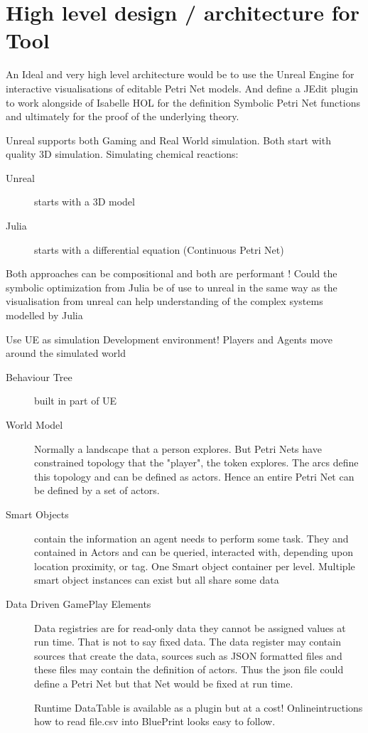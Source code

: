 \section{High level  design / architecture for  Tool }
An Ideal and very high level architecture would be to use the Unreal Engine for interactive visualisations of editable Petri Net models. And define a JEdit plugin to work alongside of Isabelle HOL for the definition Symbolic Petri Net functions and ultimately for the proof of the underlying theory.


Unreal supports both Gaming and Real World simulation. Both start with quality 3D simulation.  Simulating chemical reactions:
\begin{description}
\item[Unreal] starts with a 3D model
\item[Julia] starts with a differential equation (Continuous Petri Net)
\end{description}
Both approaches can be compositional and both are performant ! Could the symbolic optimization from Julia be of use to unreal in the same way as the visualisation from unreal can help understanding of the complex systems modelled by Julia










Use UE as simulation Development environment! Players and Agents move around the simulated  world
\begin{description}
\item[Behaviour Tree] built in part of UE
\item[World Model] Normally a landscape that a person explores. But Petri Nets have constrained topology that the "player", the token explores. The arcs define this topology and can be defined as actors. Hence an entire Petri Net can be defined by a set of actors.
\item[Smart Objects] contain the information an agent needs to perform some task. They and contained in Actors and can be queried, interacted with,  depending upon  location proximity, or tag. One Smart object container per level. Multiple smart object instances can exist but all share some data
\item[Data Driven GamePlay Elements]  Data registries are for read-only data  they cannot be assigned values at run time. That is  not to say fixed data. The data register may contain sources that create the data, sources such as JSON formatted files and these files may contain the definition of actors. Thus the json file could define a Petri Net but that Net would be fixed at run time.

Runtime DataTable is available as a plugin but at a cost!  Onlineintructions how to read file.csv into  BluePrint  looks easy to follow.



\end{description}

